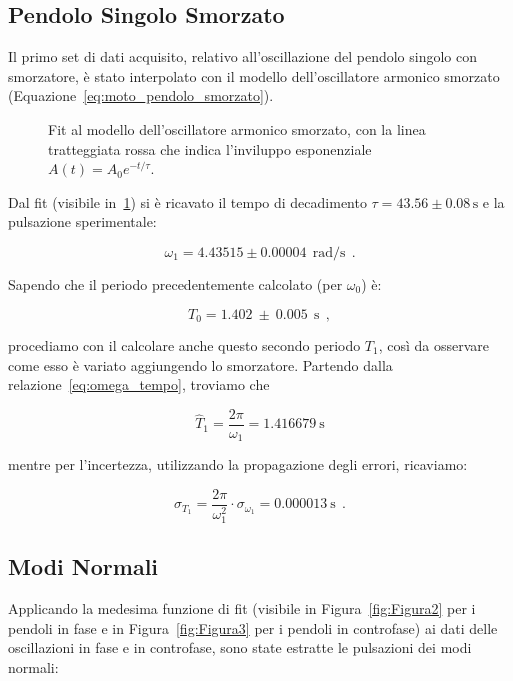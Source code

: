 \documentclass[a4paper,12pt]{article}
\begin{document}
\subsection{Pendolo Singolo Smorzato}

Il primo set di dati acquisito, relativo all'oscillazione del pendolo singolo con smorzatore, è stato interpolato con il modello dell'oscillatore armonico smorzato (Equazione~\ref{eq:moto_pendolo_smorzato}).

\begin{figure}
    \centering
    \resizebox{0.95\textwidth}{!}{%
        
    }
    \caption{Fit al modello dell'oscillatore armonico smorzato, con la linea tratteggiata rossa che indica l'inviluppo esponenziale $A(t) = A_0 e^{-t/\tau}$.}%
    \label{fig:Figura1}
\end{figure}

Dal fit (visibile in~\ref{fig:Figura1}) si è ricavato il tempo di decadimento $\tau = 43.56 \pm 0.08 \, \text{s}$ e la pulsazione sperimentale:

\[
 \omega_{1} = 4.43515 \pm 0.00004 \ \ \text{rad/s} \ \ .   
\]

Sapendo che il periodo precedentemente calcolato (per $\omega_0$) è:

\[
    T_0 = 1.402 \ \pm \ 0.005 \ \ \mathrm{s} \ \ ,
\]

procediamo con il calcolare anche questo secondo periodo $T_1$, così da osservare come esso è variato aggiungendo lo smorzatore. Partendo dalla relazione~\ref{eq:omega_tempo}, troviamo che

\[
    \hat{T}_1 = \frac{2 \pi}{\omega_1} = 1.416679 \ \mathrm{s}
\]

mentre per l'incertezza, utilizzando la propagazione degli errori, ricaviamo:

\[
    \sigma_{T_1} = \frac{2 \pi}{\omega_1^2} \cdot \sigma_{\omega_1} = 0.000013 \ \mathrm{s} \ \ .
\]



\subsection{Modi Normali}

Applicando la medesima funzione di fit (visibile in Figura~\ref{fig:Figura2} per i pendoli in fase e in Figura~\ref{fig:Figura3} per i pendoli in controfase) ai dati delle oscillazioni in fase e in controfase, sono state estratte le pulsazioni dei modi normali:
\end{document}
